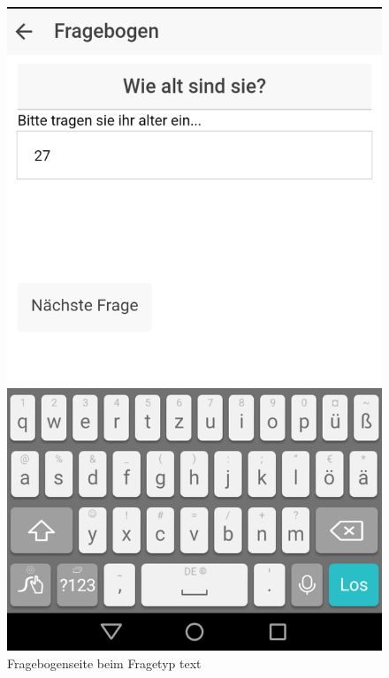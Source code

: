 \begin{figure}[H]
	\centering
	\includegraphics[scale=0.3]{images/Screenshots/PatientClient/Fragebogen_text}
	\caption[Fragebogenseite beim Fragetyp text]{Fragebogenseite beim Fragetyp text}
	\label{PatientClient_Fragebogen_text}
\end{figure}
\newpage
